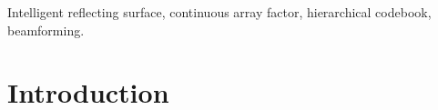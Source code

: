 \documentclass[12pt,draftclsnofoot,onecolumn]{IEEEtran}
\begin{document}
{\begin{abstract}
		
	\end{abstract}
	
	\begin{IEEEkeywords}
		Intelligent reflecting surface, continuous array factor, hierarchical codebook, beamforming.
\end{IEEEkeywords}}






\IEEEdisplaynontitleabstractindextext







%
\IEEEpeerreviewmaketitle



\section{Introduction}
%	
%	
\end{document}
